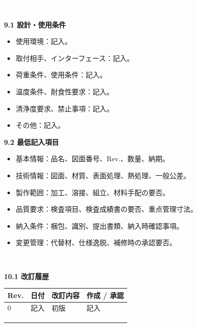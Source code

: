 \documentclass[a4paper,10pt]{ltjsarticle}
\makeatletter
\newlength{\SpecBodyWidth}
\newcommand{\PageTitle}[1]{%
  \vspace*{2mm}%
  \noindent\colorbox{SpecHead}{%
    \parbox{\dimexpr\SpecBodyWidth-2\fboxsep\relax}{%
      \large\bfseries\textcolor{white}{#1}%
    }%
  }%
  \par\vspace{5mm}%
}
\newcommand{\BlockTitle}[1]{%
  \vspace{4mm}%
  \noindent\colorbox{SpecSoft}{%
    \parbox{\dimexpr\SpecBodyWidth-2\fboxsep\relax}{%
      \normalsize\bfseries\textcolor{SpecHead}{#1}%
    }%
  }%
  \par\vspace{1.5mm}%
}
\newenvironment{SpecTable}[1]{%
  \par\vspace{1mm}%
  \noindent\footnotesize%
  \renewcommand{\arraystretch}{1.10}%
  \setlength{\tabcolsep}{3.0pt}%
  \begin{tabular*}{\SpecBodyWidth}{@{\extracolsep{\fill}}#1@{}}%
}{%
  \end{tabular*}%
  \par\vspace{1.5mm}%
}
\newcommand{\Head}[1]{\textbf{\textcolor{SpecHead}{#1}}}
\makeatother
\begin{document}
\clearpage

\PageTitle{9. 案件固有の特記事項}

\BlockTitle{9.1 設計・使用条件}
\begin{itemize}
  \item 使用環境：記入。
  \item 取付相手、インターフェース：記入。
  \item 荷重条件、使用条件：記入。
  \item 温度条件、耐食性要求：記入。
  \item 清浄度要求、禁止事項：記入。
  \item その他：記入。
\end{itemize}

\BlockTitle{9.2 最低記入項目}
\begin{itemize}
  \item 基本情報：品名、図面番号、Rev.、数量、納期。
  \item 技術情報：図面、材質、表面処理、熱処理、一般公差。
  \item 製作範囲：加工、溶接、組立、材料手配の要否。
  \item 品質要求：検査項目、検査成績書の要否、重点管理寸法。
  \item 納入条件：梱包、識別、提出書類、納入時確認事項。
  \item 変更管理：代替材、仕様逸脱、補修時の承認要否。
\end{itemize}

\clearpage

\PageTitle{10. 改訂履歴}

\BlockTitle{10.1 改訂履歴}
\begin{SpecTable}{|p{16mm}|p{28mm}|p{74mm}|p{28mm}|}
\hline
\Head{Rev.} & \Head{日付} & \Head{改訂内容} & \Head{作成 / 承認} \\
\hline
0 & 記入 & 初版 & 記入 \\
\hline
 &  &  &  \\
\hline
 &  &  &  \\
\hline
 &  &  &  \\
\hline
\end{SpecTable}
\end{document}
